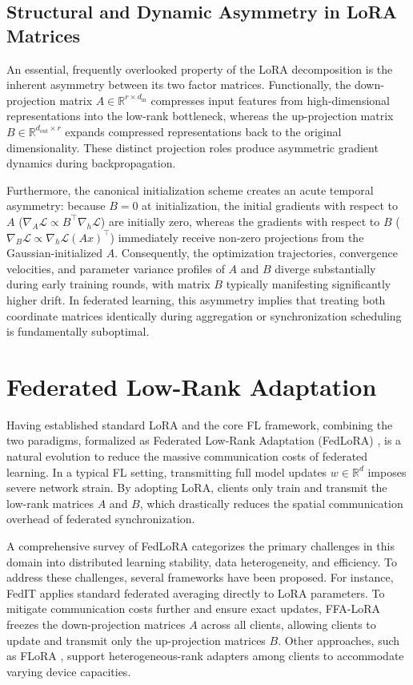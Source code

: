 \subsection{Structural and Dynamic Asymmetry in LoRA Matrices}
\label{sec:lora_asymmetry}
An essential, frequently overlooked property of the LoRA decomposition is the inherent asymmetry between its two factor matrices. Functionally, the down-projection matrix $A \in \mathbb{R}^{r \times d_{\text{in}}}$ compresses input features from high-dimensional representations into the low-rank bottleneck, whereas the up-projection matrix $B \in \mathbb{R}^{d_{\text{out}} \times r}$ expands compressed representations back to the original dimensionality. These distinct projection roles produce asymmetric gradient dynamics during backpropagation.

Furthermore, the canonical initialization scheme creates an acute temporal asymmetry: because $B = 0$ at initialization, the initial gradients with respect to $A$ ($\nabla_A \mathcal{L} \propto B^\top \nabla_h \mathcal{L}$) are initially zero, whereas the gradients with respect to $B$ ($\nabla_B \mathcal{L} \propto \nabla_h \mathcal{L} (A x)^\top$) immediately receive non-zero projections from the Gaussian-initialized $A$. Consequently, the optimization trajectories, convergence velocities, and parameter variance profiles of $A$ and $B$ diverge substantially during early training rounds, with matrix $B$ typically manifesting significantly higher drift. In federated learning, this asymmetry implies that treating both coordinate matrices identically during aggregation or synchronization scheduling is fundamentally suboptimal.

\section{Federated Low-Rank Adaptation}
\label{sec:fedlora}
Having established standard LoRA and the core FL framework, combining the two paradigms, formalized as Federated Low-Rank Adaptation (FedLoRA) \cite{yang2025federated}, is a natural evolution to reduce the massive communication costs of federated learning. In a typical FL setting, transmitting full model updates $w \in \mathbb{R}^d$ imposes severe network strain. By adopting LoRA, clients only train and transmit the low-rank matrices $A$ and $B$, which drastically reduces the spatial communication overhead of federated synchronization.

A comprehensive survey of FedLoRA \cite{yang2025federated} categorizes the primary challenges in this domain into distributed learning stability, data heterogeneity, and efficiency. To address these challenges, several frameworks have been proposed. For instance, FedIT \cite{zhang2023towards} applies standard federated averaging directly to LoRA parameters. To mitigate communication costs further and ensure exact updates, FFA-LoRA \cite{sun2024improving} freezes the down-projection matrices $A$ across all clients, allowing clients to update and transmit only the up-projection matrices $B$. Other approaches, such as FLoRA \cite{wang2024flora}, support heterogeneous-rank adapters among clients to accommodate varying device capacities.

